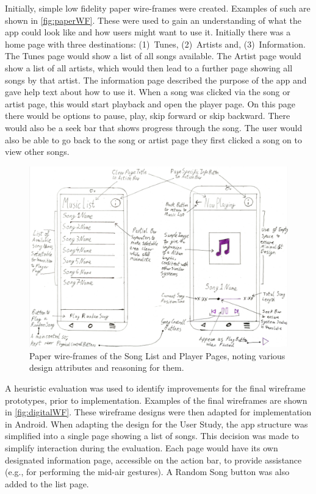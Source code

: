 \documentclass{l4proj}
\begin{document}
Initially, simple low fidelity paper wire-frames were created. Examples of such are shown in \autoref{fig:paperWF}. These were used to gain an understanding of what the app could look like and how users might want to use it. Initially there was a home page with three destinations: (1)~Tunes, (2)~Artists and, (3)~Information. The Tunes page would show a list of all songs available. The Artist page would show a list of all artists, which would then lead to a further page showing all songs by that artist. The information page described the purpose of the app and gave help text about how to use it. When a song was clicked via the song or artist page, this would start playback and open the player page. On this page there would be options to pause, play, skip forward or skip backward. There would also be a seek bar that shows progress through the song. The user would also be able to go back to the song or artist page they first clicked a song on to view other songs.

\begin{figure}[!htb]
    \centering
    \includegraphics[scale=0.0675]{images/papWF.jpg}
        \caption{Paper wire-frames of the Song List and Player Pages, noting various design attributes and reasoning for them.}
        \label{fig:paperWF}
\end{figure}

A heuristic evaluation was used to identify improvements for the final wireframe prototypes, prior to implementation. Examples of the final wireframes are shown in \autoref{fig:digitalWF}. These wireframe designs were then adapted for implementation in Android. When adapting the design for the User Study, the app structure was simplified into a single page showing a list of songs. This decision was made to simplify interaction during the evaluation. Each page would have its own designated information page, accessible on the action bar, to provide assistance (e.g., for performing the mid-air gestures). A Random Song button was also added to the list page.
\end{document}
